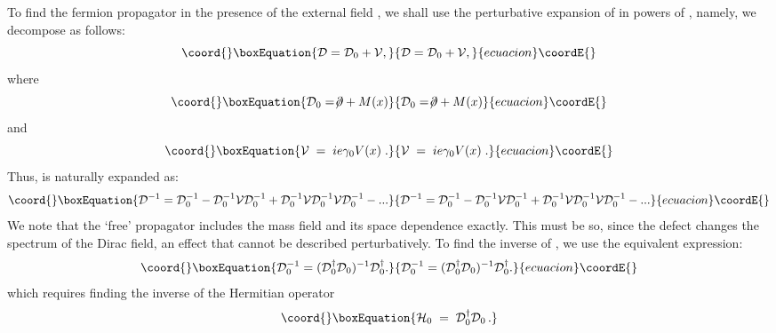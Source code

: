 \documentclass[a4paper,12pt]{article}
\begin{document}
{{To find the fermion propagator in the presence of the external field
\coordHE{}, we shall use the perturbative expansion of \coordHE{} in
powers of \coordHE{}, namely, we decompose \coordHE{} as follows:
\begin{equation}\coord{}\boxEquation{
{\mathcal D} = {\mathcal D}_0 + {\mathcal V},
}{
{\mathcal D} = {\mathcal D}_0 + {\mathcal V},
}{ecuacion}\coordE{}\end{equation}
where
\begin{equation}\coord{}\boxEquation{
{\mathcal D}_0 = \not\!\partial + M(x)
}{
{\mathcal D}_0 = \not\!\partial + M(x)
}{ecuacion}\coordE{}\end{equation}
and
\begin{equation}\coord{}\boxEquation{
{\mathcal V} \;=\; i e \gamma_0  V(x)\;.
}{
{\mathcal V} \;=\; i e \gamma_0  V(x)\;.
}{ecuacion}\coordE{}\end{equation}
Thus, \coordHE{} is naturally expanded as:
\begin{equation}\coord{}\boxEquation{
{\mathcal D}^{-1} = {\mathcal D}_0 ^{-1} - {\mathcal D}_0 ^{-1}
{\mathcal V} {\mathcal D}_0 ^{-1} + {\mathcal D}_0 ^{-1} {\mathcal V}
{\mathcal D}_0 ^{-1} {\mathcal V} {\mathcal D}_0 ^{-1}
-...\label{perturbaciones}
}{
{\mathcal D}^{-1} = {\mathcal D}_0 ^{-1} - {\mathcal D}_0 ^{-1}
{\mathcal V} {\mathcal D}_0 ^{-1} + {\mathcal D}_0 ^{-1} {\mathcal V}
{\mathcal D}_0 ^{-1} {\mathcal V} {\mathcal D}_0 ^{-1}
-...}{ecuacion}\coordE{}\end{equation}
We note that the `free' propagator \coordHE{} includes the
mass field and its space dependence exactly. This must be so, since
the defect changes the spectrum of the Dirac field, an effect that
cannot be described perturbatively. To find the inverse of \coordHE{}, we use the equivalent expression:
\begin{equation}\coord{}\boxEquation{
{\mathcal D}_0 ^{-1}=({\mathcal D}_0 ^{\dagger}{\mathcal D}_0)
^{-1}{\mathcal D}_0 ^{\dagger} \label{SdeH}.
}{
{\mathcal D}_0 ^{-1}=({\mathcal D}_0 ^{\dagger}{\mathcal D}_0)
^{-1}{\mathcal D}_0 ^{\dagger} .
}{ecuacion}\coordE{}\end{equation}
which requires finding the inverse of the Hermitian operator
\begin{equation}\coord{}\boxEquation{
   \label{eq:defh0}
{\mathcal H}_0 \;=\; {\mathcal D}_0^\dagger {\mathcal D}_0 \,.
}
\end{equation}}}
\end{document}
